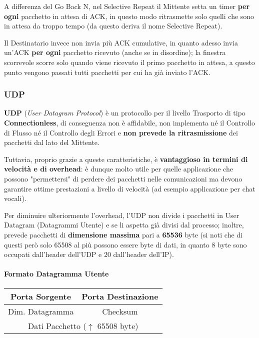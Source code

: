 \documentclass[a4paper]{article}
\begin{document}
					A differenza del Go Back N, nel Selective Repeat il Mittente setta un timer \textbf{per ogni} pacchetto in attesa di ACK, in questo modo ritrasmette solo quelli che sono in attesa da troppo tempo (da questo deriva il nome Selective Repeat).
					
					Il Destinatario invece non invia più ACK cumulative, in quanto adesso invia un'ACK \textbf{per ogni} pacchetto ricevuto (anche se in disordine); la finestra scorrevole scorre solo quando viene ricevuto il primo pacchetto in attesa, a questo punto vengono passati tutti pacchetti per cui ha già inviato l'ACK.
					
					
			\subsubsection{UDP}
			
				\textbf{UDP} (\emph{User Datagram Protocol}) è un protocollo per il livello Trasporto di tipo \textbf{Connectionless}, di conseguenza non è affidabile, non implementa né il Controllo di Flusso né il Controllo degli Errori e \textbf{non prevede la ritrasmissione} dei pacchetti dal lato del Mittente.
				
				Tuttavia, proprio grazie a queste caratteristiche, è \textbf{vantaggioso in termini di velocità e di overhead}: è dunque molto utile per quelle applicazione che possono "permettersi" di perdere dei pacchetti nelle comunicazioni ma devono garantire ottime prestazioni a livello di velocità (ad esempio applicazione per chat vocali).
				
				Per diminuire ulteriormente l'overhead, l'UDP non divide i pacchetti in User Datagram (Datagrammi Utente) e se li aspetta già divisi dal processo; inoltre, prevede pacchetti di \textbf{dimensione massima} pari a \textbf{65536} byte (si noti che di questi però solo 65508 al più possono essere byte di dati, in quanto 8 byte sono occupati dall'header dell'UDP e 20 dall'header dell'IP).				
				
				\paragraph{Formato Datagramma Utente}
					\begin{center}
						\begin{tabular}{cc}
							Porta Sorgente & Porta Destinazione \\
							\hline
							Dim. Datagramma & Checksum \\
							\hline
							\multicolumn{2}{c}{Dati Pacchetto ($ \uparrow $ 65508 byte)}
						\end{tabular}
					\end{center}
					
\end{document}
